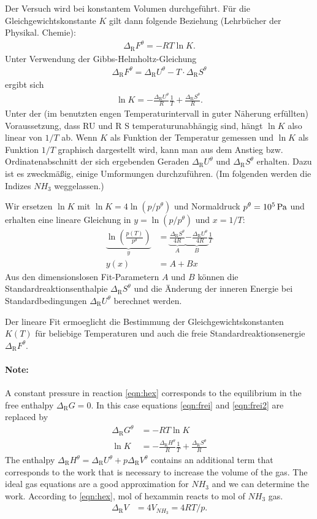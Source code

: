 \documentclass[english,twocolumn,DIV21,a4,10pt]{scrartcl}
\newcommand{\dr}{\Delta_\textrm{R}}
\begin{document}
Der Versuch wird bei konstantem Volumen durchgeführt. Für die
Gleichgewichtskonstante $K$ gilt dann folgende Beziehung (Lehrbücher
der Physikal. Chemie):
\begin{align}
  \label{eqn:frei}
  \dr F^\theta = -RT\ln K.
\end{align}
Unter Verwendung der Gibbs-Helmholtz-Gleichung
\begin{align}
  \label{eqn:frei2}
  \dr F^\theta = \dr U^\theta - T \cdot \dr S^\theta
\end{align}
ergibt sich
\begin{align}
  \ln K = -\frac{\dr U^\theta}{R}\frac{1}{T} + \frac{\dr S^\theta}{R}.
\end{align}
Unter der (im benutzten engen Temperaturintervall in guter Näherung
erfüllten) Voraussetzung, dass RU und R S temperaturunabhängig sind,
hängt $\ln K$ also linear von $1/T$ ab. Wenn $K$ als Funktion der
Temperatur gemessen und $\ln K$ als Funktion $1/T$ graphisch
dargestellt wird, kann man aus dem Anstieg bzw. Ordinatenabschnitt der
sich ergebenden Geraden $\dr U^\theta$ und $\dr S^\theta$
erhalten. Dazu ist es zweckmäßig, einige Umformungen
durchzuführen. (Im folgenden werden die Indizes $NH_3$ weggelassen.)

Wir ersetzen $\ln K$ mit $\ln K=4\ln(p/p^\theta)$ und Normaldruck
$p^\theta = \unit[10^5]{Pa}$ und erhalten eine lineare Gleichung in $y
= \ln(p/p^\theta)$ und $x=1/T$:
\begin{align}
  \label{eqn:fit}
  \underbrace{\ln \left(\frac{p(T)}{p^\theta}\right)}_y &= 
  \underbrace{\frac{\dr S^\theta}{4R}}_A \underbrace{-\frac{\dr U^\theta}{4R}}_B
  \frac{1}{T} \\
  y(x) &= A+B x
\end{align}
Aus den dimensionslosen Fit-Parametern $A$ und $B$ können die
Standardreaktionsenthalpie $\dr S^\theta$ und die \"Anderung der
inneren Energie bei Standardbedingungen $\dr U^\theta$ berechnet
werden.

Der lineare Fit ermoeglicht die Bestimmung der
Gleichgewichtskonstanten $K(T)$ f\"ur beliebige Temperaturen und auch
die freie Standardreaktionsenergie $\dr F^\theta$.

\paragraph{Note:}
A constant pressure in reaction \ref{eqn:hex} corresponds to the
equilibrium in the free enthalpy $\dr G=0$. In this case equations
\eqref{eqn:frei} and \eqref{eqn:frei2} are replaced by
\begin{align}
  \dr G^\theta &= -RT \ln K \\
  \ln K &= - \frac{\dr H^\theta}{R} \frac{1}{T} + \frac{\dr S^\theta}{R}
\end{align}
The enthalpy $\dr H^\theta=\dr U^\theta + p \dr V^\theta$ contains an
additional term that corresponds to the work that is necessary to
increase the volume of the gas. The ideal gas equations are a good
approximation for $NH_3$ and we can determine the work. According to
\eqref{eqn:hex}, \unit[1]{mol} of hexammin reacts to \unit[4]{mol} of
$NH_3$ gas.
\begin{align}
  \dr V&= 4V_{NH_3}=4RT/p.
\end{align}
\end{document}
